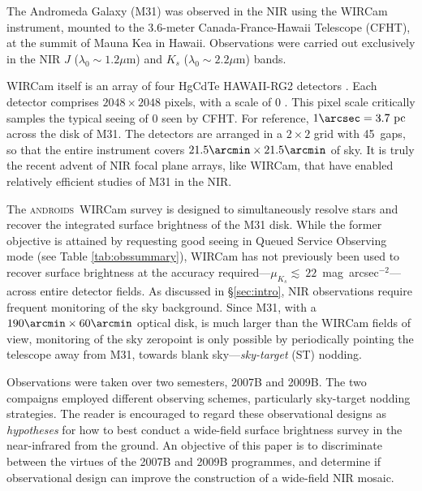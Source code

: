 \documentclass[iop]{emulateapj}
\newcommand{\androids}{\textsc{androids}}
\begin{document}

The Andromeda Galaxy (M31) was observed in the NIR using the WIRCam instrument, mounted to the 3.6-meter Canada-France-Hawaii Telescope (CFHT), at the summit of Mauna Kea in Hawaii. Observations were carried out exclusively in the NIR $J$ ($\lambda_0 \sim 1.2 \mu\mathrm{m}$) and $K_s$ ($\lambda_0 \sim 2.2 \mu\mathrm{m}$) bands.

WIRCam itself is an array of four HgCdTe HAWAII-RG2 detectors \citep{Puget:2004}. Each detector comprises $2048\times 2048$ pixels, with a scale of 0 . This pixel scale critically samples the typical seeing of 0 seen by CFHT. For reference, $1\arcsec = 3.7~\mathrm{pc}$ across the disk of M31. The detectors are arranged in a $2\times 2$ grid with 45\arcsec\ gaps, so that the entire instrument covers $21.5\arcmin \times 21.5\arcmin$ of sky. It is truly the recent advent of NIR focal plane arrays, like WIRCam, that have enabled relatively efficient studies of M31 in the NIR.

The \androids\ WIRCam survey is designed to simultaneously resolve stars and recover the integrated surface brightness of the M31 disk. While the former objective is attained by requesting good seeing in Queued Service Observing mode (see Table \ref{tab:obssummary}), WIRCam has not previously been used to recover surface brightness at the accuracy required---$\mu_{K_s}\lesssim~22$~mag~arcsec$^{-2}$---across entire detector fields. As discussed in \S \ref{sec:intro}, NIR observations require frequent monitoring of the sky background. Since M31, with a $190\arcmin \times 60\arcmin$ optical disk, is much larger than the WIRCam fields of view, monitoring of the sky zeropoint is only possible by periodically pointing the telescope away from M31, towards blank sky---\emph{sky-target} (ST) nodding. 

Observations were taken over two semesters, 2007B and 2009B. The two compaigns employed different observing schemes, particularly sky-target nodding strategies. The reader is encouraged to regard these observational designs as \emph{hypotheses} for how to best conduct a wide-field surface brightness survey in the near-infrared from the ground. An objective of this paper is to discriminate between the virtues of the 2007B and 2009B programmes, and determine if observational design can improve the construction of a wide-field NIR mosaic.
\end{document}
